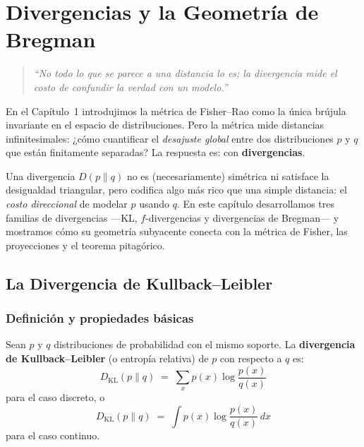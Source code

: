 
\chapter{Divergencias y la Geometría de Bregman}

\begin{quotation}
	\itshape
	``No todo lo que se parece a una distancia lo es; la divergencia mide el costo de confundir la verdad con un modelo.''
\end{quotation}

En el Capítulo~1 introdujimos la métrica de Fisher--Rao como la única brújula invariante en el espacio de distribuciones.  Pero la métrica mide distancias infinitesimales: ¿cómo cuantificar el \emph{desajuste global} entre dos distribuciones $p$ y $q$ que están finitamente separadas?  La respuesta es: con \textbf{divergencias}.

Una divergencia $D(p \| q)$ no es (necesariamente) simétrica ni satisface la desigualdad triangular, pero codifica algo más rico que una simple distancia: el \emph{costo direccional} de modelar $p$ usando $q$.  En este capítulo desarrollamos tres familias de divergencias ---KL, $f$-divergencias y divergencias de Bregman--- y mostramos cómo su geometría subyacente conecta con la métrica de Fisher, las proyecciones y el teorema pitagórico.

\section{La Divergencia de Kullback--Leibler}

\subsection{Definición y propiedades básicas}

\begin{definition}[Divergencia KL]
	Sean $p$ y $q$ distribuciones de probabilidad con el mismo soporte.  La \textbf{divergencia de Kullback--Leibler} (o entropía relativa) de $p$ con respecto a $q$ es:
	\[
	D_{\mathrm{KL}}(p \| q) \;=\; \sum_{x} p(x) \log \frac{p(x)}{q(x)}
	\]
	para el caso discreto, o
	\[
	D_{\mathrm{KL}}(p \| q) \;=\; \int p(x) \log \frac{p(x)}{q(x)}\, dx
	\]
	para el caso continuo.
\end{definition}

